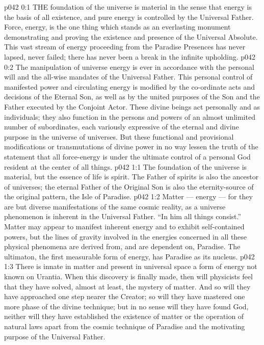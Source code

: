 \vs p042 0:1 THE foundation of the universe is material in the sense that energy is the basis of all existence, and pure energy is controlled by the Universal Father. Force, energy, is the one thing which stands as an everlasting monument demonstrating and proving the existence and presence of the Universal Absolute. This vast stream of energy proceeding from the Paradise Presences has never lapsed, never failed; there has never been a break in the infinite upholding.
\vs p042 0:2 The manipulation of universe energy is ever in accordance with the personal will and the all\hyp{}wise mandates of the Universal Father. This personal control of manifested power and circulating energy is modified by the co\hyp{}ordinate acts and decisions of the Eternal Son, as well as by the united purposes of the Son and the Father executed by the Conjoint Actor. These divine beings act personally and as individuals; they also function in the persons and powers of an almost unlimited number of subordinates, each variously expressive of the eternal and divine purpose in the universe of universes. But these functional and provisional modifications or transmutations of divine power in no way lessen the truth of the statement that all force\hyp{}energy is under the ultimate control of a personal God resident at the center of all things.
\vs p042 1:1 The foundation of the universe is material, but the essence of life is spirit. The Father of spirits is also the ancestor of universes; the eternal Father of the Original Son is also the eternity\hyp{}source of the original pattern, the Isle of Paradise.
\vs p042 1:2 Matter --- energy --- for they are but diverse manifestations of the same cosmic reality, as a universe phenomenon is inherent in the Universal Father. “In him all things consist.” Matter may appear to manifest inherent energy and to exhibit self\hyp{}contained powers, but the lines of gravity involved in the energies concerned in all these physical phenomena are derived from, and are dependent on, Paradise. The ultimaton, the first measurable form of energy, has Paradise as its nucleus.
\vs p042 1:3 \pc There is innate in matter and present in universal space a form of energy not known on Urantia. When this discovery is finally made, then will physicists feel that they have solved, almost at least, the mystery of matter. And so will they have approached one step nearer the Creator; so will they have mastered one more phase of the divine technique; but in no sense will they have found God, neither will they have established the existence of matter or the operation of natural laws apart from the cosmic technique of Paradise and the motivating purpose of the Universal Father.
